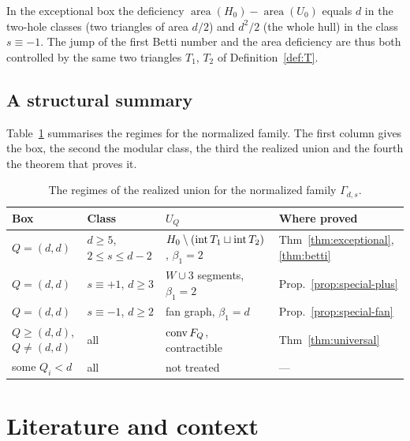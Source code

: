 In the exceptional box the deficiency $\operatorname{area}(H_0)-\operatorname{area}(U_0)$ equals $d$ in the two-hole classes (two triangles of area $d/2$) and $d^2/2$ (the whole hull) in the class $s\equiv-1$. The jump of the first Betti number and the area deficiency are thus both controlled by the same two triangles $T_1$, $T_2$ of Definition~\ref{def:T}.

\subsection{A structural summary}

Table~\ref{tab:summary} summarises the regimes for the normalized family. The first column gives the box, the second the modular class, the third the realized union and the fourth the theorem that proves it.

\begin{table}[ht]
\centering\small
\begin{tabular}{@{}llll@{}}
\toprule
Box & Class & $U_Q$ & Where proved\\
\midrule
$Q=(d,d)$ & $d\ge5$, $2\le s\le d-2$ & $H_0\setminus(\operatorname{int} T_1\sqcup\operatorname{int} T_2)$, $\beta_1=2$ & Thm~\ref{thm:exceptional}, \ref{thm:betti}\\
$Q=(d,d)$ & $s\equiv+1$, $d\ge3$ & $W\cup3$ segments, $\beta_1=2$ & Prop.~\ref{prop:special-plus}\\
$Q=(d,d)$ & $s\equiv-1$, $d\ge2$ & fan graph, $\beta_1=d$ & Prop.~\ref{prop:special-fan}\\
$Q\ge(d,d)$, $Q\ne(d,d)$ & all & $\operatorname{conv} F_Q$, contractible & Thm~\ref{thm:universal}\\
some $Q_i<d$ & all & not treated & ---\\
\bottomrule
\end{tabular}
\caption{The regimes of the realized union for the normalized family $\Gamma_{d,s}$.}\label{tab:summary}
\end{table}

\section{Literature and context}\label{sec:lit}

